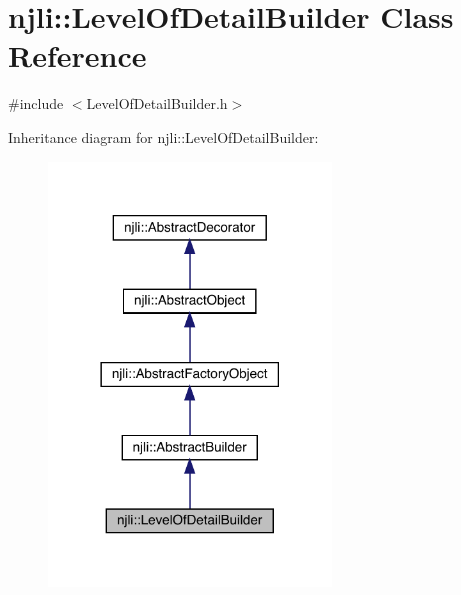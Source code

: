 \hypertarget{classnjli_1_1_level_of_detail_builder}{}\section{njli\+:\+:Level\+Of\+Detail\+Builder Class Reference}
\label{classnjli_1_1_level_of_detail_builder}


{\ttfamily \#include $<$Level\+Of\+Detail\+Builder.\+h$>$}



Inheritance diagram for njli\+:\+:Level\+Of\+Detail\+Builder\+:\nopagebreak
\begin{figure}[H]
\begin{center}
\leavevmode
\includegraphics[width=213pt]{classnjli_1_1_level_of_detail_builder__inherit__graph}
\end{center}
\end{figure}


